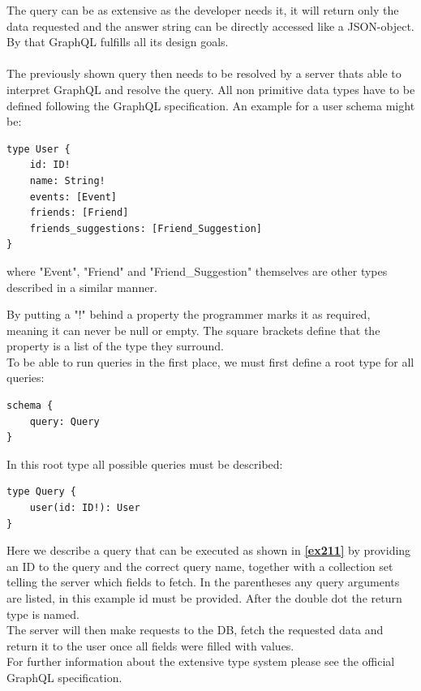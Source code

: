 The query can be as extensive as the developer needs it, it will return only the data requested and the answer string can be directly accessed like a JSON-object. By that GraphQL fulfills all its design goals.
\\ \\
The previously shown query then needs to be resolved by a server thats able to interpret GraphQL and resolve the query. All non primitive data types have to be defined following the GraphQL specification. An example for a user schema might be:

\begin{lstlisting}
type User {
	id: ID! 
	name: String! 
	events: [Event] 
	friends: [Friend] 
	friends_suggestions: [Friend_Suggestion] 
}
\end{lstlisting}

\noindent
where "Event", "Friend" and "Friend\_Suggestion" themselves are other types described in a similar manner.

By putting a "!" behind a property the programmer marks it as required, meaning it can never be null or empty. The square brackets define that the property is a list of the type they surround.
\\
To be able to run queries in the first place, we must first define a root type for all queries:

\begin{lstlisting}
schema {
	query: Query
}
\end{lstlisting}

In this root type all possible queries must be described:

\begin{lstlisting}
type Query { 
	user(id: ID!): User 
}
\end{lstlisting}

Here we describe a query that can be executed as shown in
\textbf{\ref{ex211}} by providing an ID to the query and the correct query name, together with a collection set telling the server which fields to fetch. In the parentheses any query arguments are listed, in this example id must be provided. After the double dot the return type is named. 
\\
The server will then make requests to the DB, fetch the requested data and return it to the user once all fields were filled with values.
\\
For further information about the extensive type system please see the official GraphQL specification. \cite{GraphQLSpec}

